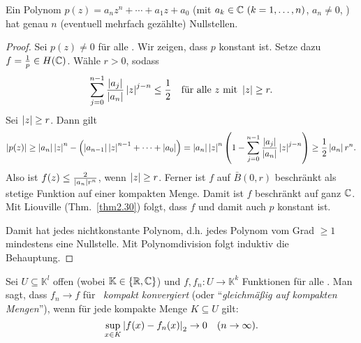\documentclass[a4paper,twoside,DIV15,BCOR12mm]{scrbook}
\begin{document}
\begin{kor} \label{kor2.31}
  Ein Polynom $p(z)=a_nz^n+\dotsb+a_1z+a_0$ (mit $a_k\in\mathbb{C}\ (k=1,\dotsc,n)$, $a_n\neq0$, ) hat genau $n$ (eventuell mehrfach gezählte) Nullstellen.
\end{kor}
\begin{proof}
  Sei $p(z)\neq0$ für alle . Wir zeigen, dass $p$ konstant ist. Setze dazu $f=\frac1p\in H(\mathbb{C})$. Wähle $r>0$, sodass
  \[ \sum_{j=0}^{n-1}{\frac{\left\lvert a_j\right\lvert}{\left\lvert a_n\right\lvert}\left\lvert z\right\lvert^{j-n}} \le \frac12 \quad \text{für alle $z$ mit } \left\lvert z\right\lvert \ge r. \]
  Sei $\left\lvert z\right\lvert \ge r$. Dann gilt
  \[ \left\lvert p(z)\right\lvert \ge \left\lvert a_n\right\lvert\left\lvert z\right\lvert^n - \left(\left\lvert a_{n-1}\right\lvert\left\lvert z\right\lvert^{n-1} + \dotsb + \left\lvert a_0\right\lvert\right) =
  \left\lvert a_n\right\lvert\left\lvert z\right\lvert^n \left(1-\sum_{j=0}^{n-1}{\frac{\left\lvert a_j\right\lvert}{\left\lvert a_n\right\lvert}\left\lvert z\right\lvert^{j-n}} \right) \ge
  \frac12\left\lvert a_n\right\lvert r^n.\]
  Also ist $f(z)\le \frac{2}{\left\lvert a_n\right\lvert r^n}$, wenn $\left\lvert z\right\lvert\ge r$. Ferner ist $f$ auf $\bar{B}(0,r)$ beschränkt als stetige
  Funktion auf einer kompakten Menge. Damit ist $f$ beschränkt auf ganz $\mathbb{C}$. Mit Liouville (Thm.~\ref{thm2.30}) folgt, dass $f$
  und damit auch $p$ konstant ist.

  Damit hat jedes nichtkonstante Polynom, d.h. jedes Polynom vom Grad $\ge1$ mindestens eine Nullstelle. Mit Polynomdivision
  folgt induktiv die Behauptung.
\end{proof}

\begin{dfn} \label{dfn2.32}
  Sei $U\subseteq\mathbb{K}^l$ offen (wobei $\mathbb{K}\in\{\mathbb{R},\mathbb{C}\}$) und $f,f_n\colon U\to\mathbb{K}^k$ Funktionen für alle
  . Man sagt, dass $f_n\to f$ für \ninf \ \emph{kompakt konvergiert} (oder "`\emph{gleichmäßig auf kompakten Mengen}"'),
  wenn für jede kompakte Menge $K\subseteq U$ gilt: \[ \sup_{x\in K}{\left\lvert f(x)-f_n(x)\right\lvert_2}\to0 \quad (n\rightarrow\infty). \]
\end{dfn}
\end{document}
